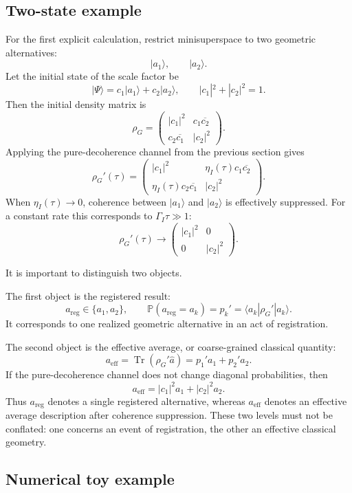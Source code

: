 \documentclass[12pt,a4paper]{article}
\DeclareMathOperator{\Tr}{Tr}
\newcommand{\Prob}{\mathbb P}
\newcommand{\Eff}{\mathrm{eff}}
\begin{document}
\subsection{Two-state example}

For the first explicit calculation, restrict minisuperspace to two geometric alternatives:
\[
|a_1\rangle,
\qquad
|a_2\rangle.
\]
Let the initial state of the scale factor be
\[
\boxed{
|\Psi\rangle
=
c_1|a_1\rangle+c_2|a_2\rangle,
\qquad
|c_1|^2+|c_2|^2=1.
}
\]
Then the initial density matrix is
\[
\rho_G
=
\begin{pmatrix}
|c_1|^2 & c_1\overline{c_2}\\
c_2\overline{c_1} & |c_2|^2
\end{pmatrix}.
\]
Applying the pure-decoherence channel from the previous section gives
\[
\boxed{
\rho_G'(\tau)
=
\begin{pmatrix}
|c_1|^2 & \eta_I(\tau)c_1\overline{c_2}\\
\eta_I(\tau)c_2\overline{c_1} & |c_2|^2
\end{pmatrix}.
}
\]
When $\eta_I(\tau)\to0$, coherence between $|a_1\rangle$ and $|a_2\rangle$ is effectively suppressed. For a constant rate this corresponds to $\Gamma_I\tau\gg1$:
\[
\rho_G'(\tau)
\longrightarrow
\begin{pmatrix}
|c_1|^2 & 0\\
0 & |c_2|^2
\end{pmatrix}.
\]

It is important to distinguish two objects.

The first object is the registered result:
\[
\boxed{
a_{\mathrm{reg}}\in\{a_1,a_2\},
\qquad
\Prob(a_{\mathrm{reg}}=a_k)=p_k'=
\langle a_k|\rho_G'|a_k\rangle.
}
\]
It corresponds to one realized geometric alternative in an act of registration.

The second object is the effective average, or coarse-grained classical quantity:
\[
\boxed{
a_{\Eff}
=
\Tr(\rho_G'\widehat a)
=
p_1'a_1+p_2'a_2.
}
\]
If the pure-decoherence channel does not change diagonal probabilities, then
\[
\boxed{
a_{\Eff}
=
|c_1|^2a_1+|c_2|^2a_2.
}
\]
Thus $a_{\mathrm{reg}}$ denotes a single registered alternative, whereas $a_{\Eff}$ denotes an effective average description after coherence suppression. These two levels must not be conflated: one concerns an event of registration, the other an effective classical geometry.

\subsection{Numerical toy example}
\end{document}
